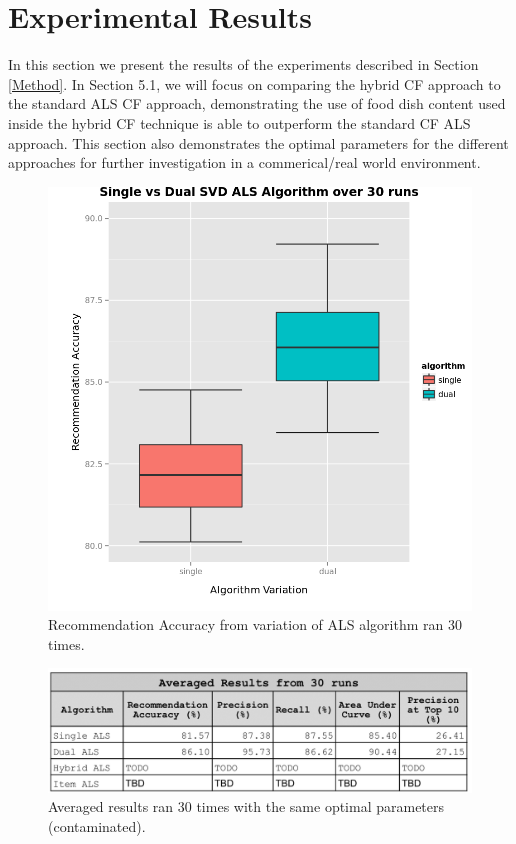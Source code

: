 \section{Experimental Results}

In this section we present the results of the experiments described in Section \ref{Method}. In Section 5.1, we will focus on comparing the hybrid CF approach to the standard ALS CF approach, demonstrating the use of food dish content used inside the hybrid CF technique is able to outperform the standard CF ALS approach. This section also demonstrates the optimal parameters for the different approaches for further investigation in a commerical/real world environment.  

\begin{figure}
\centering
\includegraphics[scale=0.7]{images/single_vs_dual.png}
\caption{Recommendation Accuracy from variation of ALS algorithm ran 30 times.}
\label{fig:algorithms}
\end{figure}


\begin{figure}
\centering
\includegraphics[scale=0.4]{images/results_tuning.png}
\caption{Averaged results ran 30 times with the same optimal parameters (contaminated).}
\label{fig:results}
\end{figure}

